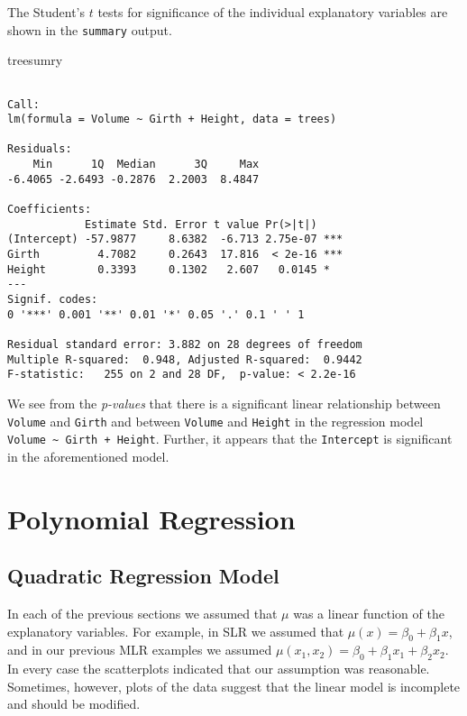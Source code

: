 \documentclass[]{book}
\newenvironment{Shaded}{\begin{snugshade}}{\end{snugshade}}
\newcommand{\NormalTok}[1]{{#1}}
\numberwithin{equation}{chapter}
\numberwithin{figure}{chapter}
\theoremstyle{plain}
\theoremstyle{definition}
\theoremstyle{remark}
\theoremstyle{definition}
\theoremstyle{definition}
\theoremstyle{remark}
\begin{document}
The Student's \(t\) tests for significance of the individual explanatory
variables are shown in the \texttt{summary} output.

\begin{Shaded}
\begin{Highlighting}[]
\NormalTok{treesumry}
\end{Highlighting}
\end{Shaded}

\begin{verbatim}

Call:
lm(formula = Volume ~ Girth + Height, data = trees)

Residuals:
    Min      1Q  Median      3Q     Max 
-6.4065 -2.6493 -0.2876  2.2003  8.4847 

Coefficients:
            Estimate Std. Error t value Pr(>|t|)    
(Intercept) -57.9877     8.6382  -6.713 2.75e-07 ***
Girth         4.7082     0.2643  17.816  < 2e-16 ***
Height        0.3393     0.1302   2.607   0.0145 *  
---
Signif. codes:  
0 '***' 0.001 '**' 0.01 '*' 0.05 '.' 0.1 ' ' 1

Residual standard error: 3.882 on 28 degrees of freedom
Multiple R-squared:  0.948, Adjusted R-squared:  0.9442 
F-statistic:   255 on 2 and 28 DF,  p-value: < 2.2e-16
\end{verbatim}

We see from the \emph{p-values} that there is a significant linear
relationship between \texttt{Volume} and \texttt{Girth} and between
\texttt{Volume} and \texttt{Height} in the regression model
\texttt{Volume\ \textasciitilde{}\ Girth\ +\ Height}. Further, it
appears that the \texttt{Intercept} is significant in the aforementioned
model.

\section{Polynomial Regression}\label{sec-polynomial-regression}

\subsection{Quadratic Regression
Model}\label{quadratic-regression-model}

In each of the previous sections we assumed that \(\mu\) was a linear
function of the explanatory variables. For example, in SLR we assumed
that \(\mu(x)=\beta_{0}+\beta_{1}x\), and in our previous MLR examples
we assumed
\(\mu(x_{1},x_{2}) = \beta_{0}+\beta_{1}x_{1} + \beta_{2}x_{2}\). In
every case the scatterplots indicated that our assumption was
reasonable. Sometimes, however, plots of the data suggest that the
linear model is incomplete and should be modified.
\end{document}
